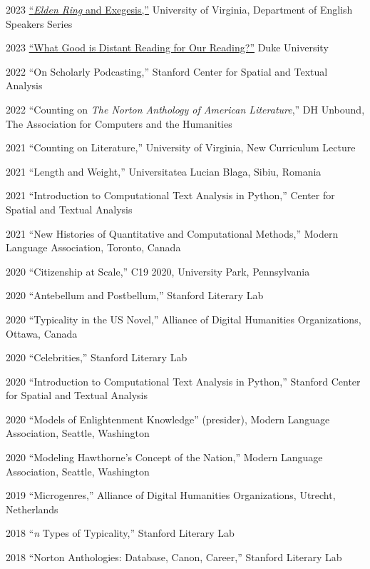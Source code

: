 \documentclass[12pt,letterpaper]{report}
\begin{document}
\begin{tablist}
	\item[2023] \tab{}\href{https://fredner.org/er/}{\enquote{\emph{Elden Ring} and Exegesis,}} University of Virginia, Department of English Speakers Series
	\item[2023] \tab{}\href{https://fredner.org/duke/}{\enquote{What Good is Distant Reading for Our Reading?}} Duke University
	\item[2022] \tab{}\enquote{On Scholarly Podcasting,} Stanford Center for Spatial and Textual Analysis
	\item[2022] \tab{}\enquote{Counting on \emph{The Norton Anthology of American Literature},} DH Unbound, The Association for Computers and the Humanities
	\item[2021] \tab{}\enquote{Counting on Literature,} University of Virginia, New Curriculum Lecture
	\item[2021] \tab{}\enquote{Length and Weight,} Universitatea Lucian Blaga, Sibiu, Romania
	\item[2021] \tab{}\enquote{Introduction to Computational Text Analysis in Python,} Center for Spatial and Textual Analysis
	\item[2021] \tab{}\enquote{New Histories of Quantitative and Computational Methods,} Modern Language Association, Toronto, Canada
	\item[2020] \tab{}\enquote{Citizenship at Scale,} C19 2020, University Park, Pennsylvania
	\item[2020] \tab{}\enquote{Antebellum and Postbellum,} Stanford Literary Lab
	\item[2020] \tab{}\enquote{Typicality in the US Novel,} Alliance of Digital Humanities Organizations, Ottawa, Canada
	\item[2020] \tab{}\enquote{Celebrities,} Stanford Literary Lab
	\item[2020] \tab{}\enquote{Introduction to Computational Text Analysis in Python,} Stanford Center for Spatial and Textual Analysis
	\item[2020] \tab{}\enquote{Models of Enlightenment Knowledge} (presider), Modern Language Association, Seattle, Washington
	\item[2020] \tab{}\enquote{Modeling Hawthorne's Concept of the Nation,} Modern Language Association, Seattle, Washington
	\item[2019] \tab{}\enquote{Microgenres,} Alliance of Digital Humanities Organizations, Utrecht, Netherlands
	\item[2018] \tab{}\enquote{\emph{n} Types of Typicality,} Stanford Literary Lab
	\item[2018] \tab{}\enquote{Norton Anthologies: Database, Canon, Career,} Stanford Literary Lab

\end{tablist}
\end{document}

